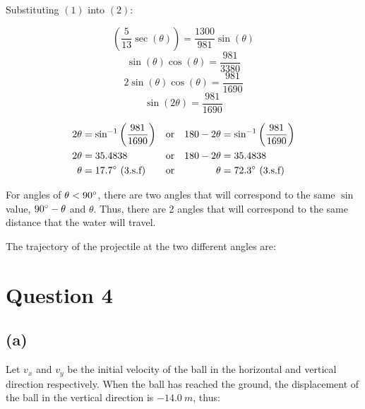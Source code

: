 \documentclass[11pt]{article}
\begin{document}
Substituting \((1)\) into \((2)\):

\[\left(\frac{5}{13}\sec(\theta)\right) = \frac{1300}{981}\sin(\theta)\]
\[\sin(\theta)\cos(\theta) = \frac{981}{3380}\]
\[2\sin(\theta)\cos(\theta) = \frac{981}{1690}\]
\[\sin(2\theta) = \frac{981}{1690}\]

\begin{align*}
2\theta &= \sin^{-1}\left(\frac{981}{1690}\right) &\text{or}&
&180 - 2\theta &= \sin^{-1}\left(\frac{981}{1690}\right) \\
2\theta &= 35.4838 &\text{or}&
&180 - 2\theta &= 35.4838 \\
\theta &= 17.7 \degree \text{ (3.s.f)} &\text{or}&
&\theta &= 72.3 \degree \text{ (3.s.f)}
\end{align*}

For angles of \(\theta < 90 \degree\), there are two angles that will correspond to the same \(\sin\) value, \(90 \degree - \theta\) and \(\theta\). Thus, there are 2 angles that will correspond to the same distance that the water will travel.

\newpage

The trajectory of the projectile at the two different angles are:
\\[0pt]

\begin{center}
\end{center}


\section{Question 4}
\label{sec:org21b0f3b}

\subsection{(a)}
\label{sec:orgb2225c1}

Let \(v_x\) and \(v_y\) be the initial velocity of the ball in the horizontal and vertical direction respectively. When the ball has reached the ground, the displacement of the ball in the vertical direction is \(\qty{-14.0}{m}\), thus:
\end{document}
